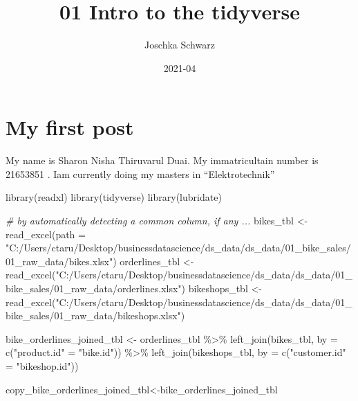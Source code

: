 \documentclass[
]{article}
\title{01 Intro to the tidyverse}
\author{Joschka Schwarz}
\date{2021-04}
\newenvironment{Shaded}{\begin{snugshade}}{\end{snugshade}}
\newcommand{\AttributeTok}[1]{\textcolor[rgb]{0.77,0.63,0.00}{#1}}
\newcommand{\CommentTok}[1]{\textcolor[rgb]{0.56,0.35,0.01}{\textit{#1}}}
\newcommand{\FunctionTok}[1]{\textcolor[rgb]{0.00,0.00,0.00}{#1}}
\newcommand{\NormalTok}[1]{#1}
\newcommand{\OtherTok}[1]{\textcolor[rgb]{0.56,0.35,0.01}{#1}}
\newcommand{\SpecialCharTok}[1]{\textcolor[rgb]{0.00,0.00,0.00}{#1}}
\newcommand{\StringTok}[1]{\textcolor[rgb]{0.31,0.60,0.02}{#1}}
\begin{document}
\maketitle

{
\setcounter{tocdepth}{3}
\tableofcontents
}
\hypertarget{my-first-post}{%
\section{My first post}\label{my-first-post}}

My name is Sharon Nisha Thiruvarul Duai. My immatricultain number is
21653851 . Iam currently doing my masters in ``Elektrotechnik''

\begin{Shaded}
\begin{Highlighting}[]
\FunctionTok{library}\NormalTok{(readxl)}
\FunctionTok{library}\NormalTok{(tidyverse)}
\FunctionTok{library}\NormalTok{(lubridate)}

\CommentTok{\# by automatically detecting a common column, if any ...}
\NormalTok{bikes\_tbl      }\OtherTok{\textless{}{-}} \FunctionTok{read\_excel}\NormalTok{(}\AttributeTok{path =} \StringTok{"C:/Users/ctaru/Desktop/businessdatascience/ds\_data/ds\_data/01\_bike\_sales/01\_raw\_data/bikes.xlsx"}\NormalTok{)}
\NormalTok{orderlines\_tbl }\OtherTok{\textless{}{-}} \FunctionTok{read\_excel}\NormalTok{(}\StringTok{"C:/Users/ctaru/Desktop/businessdatascience/ds\_data/ds\_data/01\_bike\_sales/01\_raw\_data/orderlines.xlsx"}\NormalTok{)}
\NormalTok{bikeshops\_tbl }\OtherTok{\textless{}{-}}\FunctionTok{read\_excel}\NormalTok{(}\StringTok{"C:/Users/ctaru/Desktop/businessdatascience/ds\_data/ds\_data/01\_bike\_sales/01\_raw\_data/bikeshops.xlsx"}\NormalTok{)}



\NormalTok{bike\_orderlines\_joined\_tbl }\OtherTok{\textless{}{-}}\NormalTok{ orderlines\_tbl }\SpecialCharTok{\%\textgreater{}\%}
        \FunctionTok{left\_join}\NormalTok{(bikes\_tbl, }\AttributeTok{by =} \FunctionTok{c}\NormalTok{(}\StringTok{"product.id"} \OtherTok{=} \StringTok{"bike.id"}\NormalTok{)) }\SpecialCharTok{\%\textgreater{}\%}
        \FunctionTok{left\_join}\NormalTok{(bikeshops\_tbl, }\AttributeTok{by =} \FunctionTok{c}\NormalTok{(}\StringTok{"customer.id"} \OtherTok{=} \StringTok{"bikeshop.id"}\NormalTok{))}



\NormalTok{copy\_bike\_orderlines\_joined\_tbl}\OtherTok{\textless{}{-}}\NormalTok{bike\_orderlines\_joined\_tbl}




\end{Highlighting}
\end{Shaded}
\end{document}
